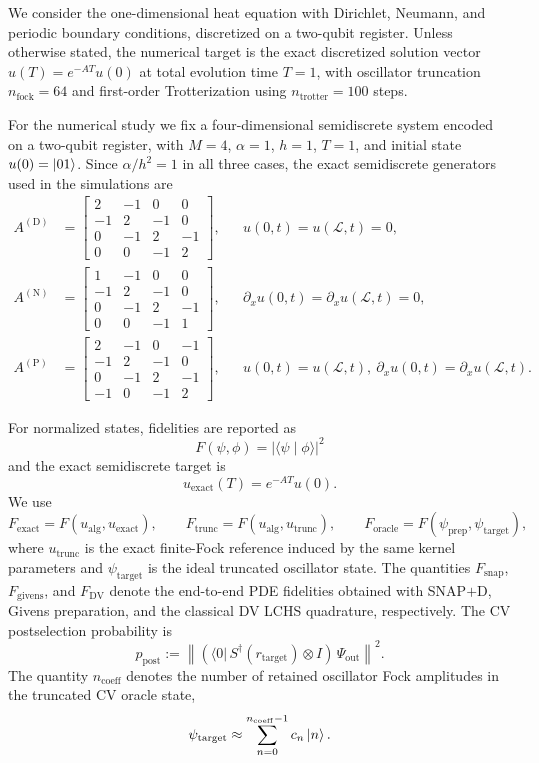 We consider the one-dimensional heat equation with Dirichlet, Neumann, and periodic boundary conditions, discretized on a two-qubit register. Unless otherwise stated, the numerical target is the exact discretized solution vector $u(T)=e^{-AT}u(0)$ at total evolution time $T=1$, with oscillator truncation $n_{\mathrm{fock}}=64$ and first-order Trotterization using $n_{\mathrm{trotter}}=100$ steps.

For the numerical study we fix a four-dimensional semidiscrete system encoded on a two-qubit register, with $M=4$, $\alpha=1$, $h=1$, $T=1$, and initial state $u(0)=\ket{01}$. Since $\alpha/h^2=1$ in all three cases, the exact semidiscrete generators used in the simulations are
{\small
\[
\begin{aligned}
A^{(\mathrm D)}&=
\begin{bmatrix}
2&-1&0&0\\
-1&2&-1&0\\
0&-1&2&-1\\
0&0&-1&2
\end{bmatrix},
&&u(0,t)=u(\mathcal L,t)=0,\\[0.5em]
A^{(\mathrm N)}&=
\begin{bmatrix}
1&-1&0&0\\
-1&2&-1&0\\
0&-1&2&-1\\
0&0&-1&1
\end{bmatrix},
&&\partial_x u(0,t)=\partial_x u(\mathcal L,t)=0,\\[0.5em]
A^{(\mathrm P)}&=
\begin{bmatrix}
2&-1&0&-1\\
-1&2&-1&0\\
0&-1&2&-1\\
-1&0&-1&2
\end{bmatrix},
&&u(0,t)=u(\mathcal L,t),\ \partial_x u(0,t)=\partial_x u(\mathcal L,t).
\end{aligned}
\]
}

For normalized states, fidelities are reported as
\[
F(\psi,\phi)=|\langle \psi \mid \phi\rangle|^2
\]
and the exact semidiscrete target is
\[
u_{\mathrm{exact}}(T)=e^{-AT}u(0).
\]
We use
\[
F_{\mathrm{exact}}=F(u_{\mathrm{alg}},u_{\mathrm{exact}}),\qquad
F_{\mathrm{trunc}}=F(u_{\mathrm{alg}},u_{\mathrm{trunc}}),\qquad
F_{\mathrm{oracle}}=F(\psi_{\mathrm{prep}},\psi_{\mathrm{target}}),
\]
where $u_{\mathrm{trunc}}$ is the exact finite-Fock reference induced by the same kernel parameters and $\psi_{\mathrm{target}}$ is the ideal truncated oscillator state. The quantities $F_{\mathrm{snap}}$, $F_{\mathrm{givens}}$, and $F_{\mathrm{DV}}$ denote the end-to-end PDE fidelities obtained with SNAP$+$D, Givens preparation, and the classical DV LCHS quadrature, respectively. The CV postselection probability is
\[
p_{\mathrm{post}}
 :=
\left\|
(\langle 0|\,S^\dagger(r_{\mathrm{target}})\otimes I)\,\Psi_{\mathrm{out}}
\right\|^2 .
\]
The quantity $n_{\mathrm{coeff}}$ denotes the number of retained oscillator Fock amplitudes in the truncated CV oracle state,
\[
\psi_{\mathrm{target}} \approx \sum_{n=0}^{n_{\mathrm{coeff}}-1} c_n \ket{n}.
\]

